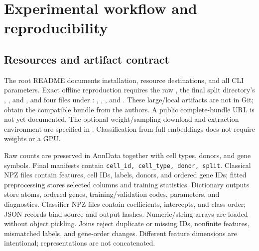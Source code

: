 \section{Experimental workflow and reproducibility}\label{app:workflow}
\subsection{Resources and artifact contract}
The root README documents installation, resource destinations, and all CLI
parameters. Exact offline reproduction requires the raw
, the final split directory's
, , and
, and four files under
:
, ,
, and .
These large/local artifacts are not in Git; obtain the compatible bundle
from the authors. A public complete-bundle URL is not yet documented.
The optional weight/sampling download and extraction environment are
specified in . Classification from full embeddings
does not require weights or a GPU.

Raw counts are preserved in AnnData together with cell types, donors, and gene
symbols. Final manifests contain \texttt{cell\_id, cell\_type, donor, split}.
Classical NPZ files contain features, cell IDs, labels, donors, and ordered
gene IDs; fitted preprocessing stores selected columns and training statistics.
Dictionary outputs store atoms, ordered genes, training/validation codes,
parameters, and diagnostics. Classifier NPZ files contain coefficients,
intercepts, and class order; JSON records bind source and output hashes.
Numeric/string arrays are loaded without object pickling. Joins reject duplicate
or missing IDs, nonfinite features, mismatched labels, and gene-order changes.
Different feature dimensions are intentional; representations are not concatenated.

